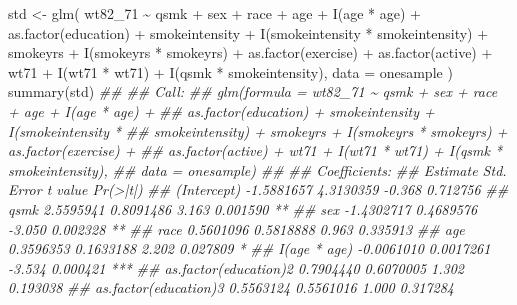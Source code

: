 \documentclass[
  10pt,
  a4paper,
]{book}
\newenvironment{Shaded}{\begin{snugshade}}{\end{snugshade}}
\newcommand{\AttributeTok}[1]{\textcolor[rgb]{0.40,0.45,0.13}{#1}}
\newcommand{\DocumentationTok}[1]{\textcolor[rgb]{0.37,0.37,0.37}{\textit{#1}}}
\newcommand{\FunctionTok}[1]{\textcolor[rgb]{0.28,0.35,0.67}{#1}}
\newcommand{\NormalTok}[1]{\textcolor[rgb]{0.00,0.46,0.62}{#1}}
\newcommand{\OtherTok}[1]{\textcolor[rgb]{0.00,0.46,0.62}{#1}}
\newcommand{\SpecialCharTok}[1]{\textcolor[rgb]{0.37,0.37,0.37}{#1}}
\begin{document}
\begin{Shaded}
\begin{Highlighting}[]
\NormalTok{std }\OtherTok{\textless{}{-}} \FunctionTok{glm}\NormalTok{(}
\NormalTok{  wt82\_71 }\SpecialCharTok{\textasciitilde{}}\NormalTok{ qsmk }\SpecialCharTok{+}\NormalTok{ sex }\SpecialCharTok{+}\NormalTok{ race }\SpecialCharTok{+}\NormalTok{ age }\SpecialCharTok{+} \FunctionTok{I}\NormalTok{(age }\SpecialCharTok{*}\NormalTok{ age)}
  \SpecialCharTok{+} \FunctionTok{as.factor}\NormalTok{(education) }\SpecialCharTok{+}\NormalTok{ smokeintensity}
  \SpecialCharTok{+} \FunctionTok{I}\NormalTok{(smokeintensity }\SpecialCharTok{*}\NormalTok{ smokeintensity) }\SpecialCharTok{+}\NormalTok{ smokeyrs}
  \SpecialCharTok{+} \FunctionTok{I}\NormalTok{(smokeyrs }\SpecialCharTok{*}\NormalTok{ smokeyrs) }\SpecialCharTok{+} \FunctionTok{as.factor}\NormalTok{(exercise)}
  \SpecialCharTok{+} \FunctionTok{as.factor}\NormalTok{(active) }\SpecialCharTok{+}\NormalTok{ wt71 }\SpecialCharTok{+} \FunctionTok{I}\NormalTok{(wt71 }\SpecialCharTok{*}\NormalTok{ wt71) }\SpecialCharTok{+} \FunctionTok{I}\NormalTok{(qsmk }\SpecialCharTok{*}\NormalTok{ smokeintensity),}
  \AttributeTok{data =}\NormalTok{ onesample}
\NormalTok{)}
\FunctionTok{summary}\NormalTok{(std)}
\DocumentationTok{\#\# }
\DocumentationTok{\#\# Call:}
\DocumentationTok{\#\# glm(formula = wt82\_71 \textasciitilde{} qsmk + sex + race + age + I(age * age) + }
\DocumentationTok{\#\#     as.factor(education) + smokeintensity + I(smokeintensity * }
\DocumentationTok{\#\#     smokeintensity) + smokeyrs + I(smokeyrs * smokeyrs) + as.factor(exercise) + }
\DocumentationTok{\#\#     as.factor(active) + wt71 + I(wt71 * wt71) + I(qsmk * smokeintensity), }
\DocumentationTok{\#\#     data = onesample)}
\DocumentationTok{\#\# }
\DocumentationTok{\#\# Coefficients:}
\DocumentationTok{\#\#                                      Estimate Std. Error t value Pr(\textgreater{}|t|)    }
\DocumentationTok{\#\# (Intercept)                        {-}1.5881657  4.3130359  {-}0.368 0.712756    }
\DocumentationTok{\#\# qsmk                                2.5595941  0.8091486   3.163 0.001590 ** }
\DocumentationTok{\#\# sex                                {-}1.4302717  0.4689576  {-}3.050 0.002328 ** }
\DocumentationTok{\#\# race                                0.5601096  0.5818888   0.963 0.335913    }
\DocumentationTok{\#\# age                                 0.3596353  0.1633188   2.202 0.027809 *  }
\DocumentationTok{\#\# I(age * age)                       {-}0.0061010  0.0017261  {-}3.534 0.000421 ***}
\DocumentationTok{\#\# as.factor(education)2               0.7904440  0.6070005   1.302 0.193038    }
\DocumentationTok{\#\# as.factor(education)3               0.5563124  0.5561016   1.000 0.317284    }

\end{Highlighting}
\end{Shaded}
\end{document}
